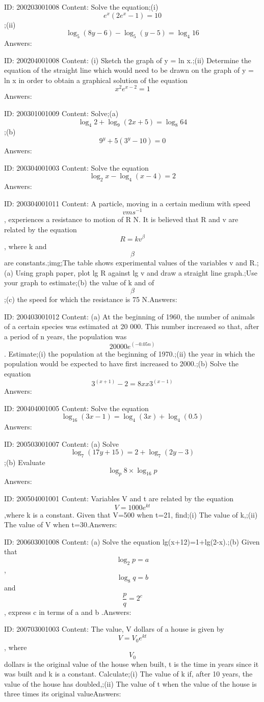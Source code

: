 \documentclass{article}
\begin{document}
ID: 200203001008
Content:
Solve the equation;(i) $$e^x(2e^x-1)=10$$;(ii) $$\log_5(8y-6)-\log_5(y-5)=\log_4 16$$Answers:

ID: 200204001008
Content:
(i)	Sketch the graph of y = ln x.;(ii)	Determine the equation of the straight line which would need to be drawn on the graph of y = ln x in order to obtain a graphical solution of the equation $$x^2e^{x-2}=1$$Answers:

ID: 200301001009
Content:
Solve;(a) $$\log_4 2+\log_9(2x+5)=\log_8 64$$;(b) $$9^y+5(3^y-10)=0$$Answers:

ID: 200304001003
Content:
Solve the equation $$\log_2x-\log_4(x-4)=2$$Answers:

ID: 200304001011
Content:
A particle, moving in a certain medium with speed $$v ms^{-1}$$, experiences a resistance to motion of R N. It is believed that R and v are related by the equation $$R=kv^{\beta}$$, where k and $$\beta$$ are constants.;img;The table shows experimental values of the variables v and R.;(a)	Using graph paper, plot lg R against lg v and draw a straight line graph.;Use your graph to estimate;(b)	the value of k and of $$\beta$$;(c)	the speed for which the resistance is 75 N.Answers:

ID: 200403001012
Content:
(a)	At the beginning of 1960, the number of animals of a certain species was estimated at 20 000. This number increased so that, after a period of n years, the population was \[20000e^{(-0.05n)}\]. Estimate;(i) the population at the beginning of 1970.;(ii) the year in which the population would be expected to have first increased to 2000.;(b) Solve the equation \[3^{(x+1)}-2=8 xx 3^{(x-1)}\]Answers:

ID: 200404001005
Content:
Solve the equation $$\log_16(3x-1)=\log_4(3x)+\log_4(0.5)$$Answers:

ID: 200503001007
Content:
(a) Solve $$\log_7(17y+15)=2+\log_7(2y-3)$$;(b) Evaluate $$\log_p 8 \times \log_16 p$$Answers:

ID: 200504001001
Content:
Variables V and t are related by the equation $$V=1000e^{kt}$$ ,where k is a constant. Given that V=500 when t=21, find;(i) The value of k,;(ii) The value of V when t=30.Answers:

ID: 200603001008
Content:
(a) Solve the equation lg(x+12)=1+lg(2-x).;(b)	Given that $$\log_2 p=a$$, $$\log_8 q=b$$ and $$\frac{p}{q}=2^c$$, express c in terms of a and b .Answers:

ID: 200703001003
Content:
The value, V dollars of a house is given by $$V=V_0e^{kt}$$, where $$V_0$$ dollars is the original value of the house when built, t is the time in years since it was built and k is a constant. Calculate;(i) The value of k if, after 10 years, the value of the house has doubled,;(ii)	The value of t when the value of the house is three times its original valueAnswers:
\end{document}
